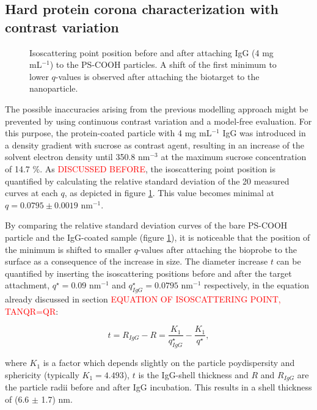 \subsection{Hard protein corona characterization with contrast variation}
\label{sec:coated_kisker_continuous}

\begin{figure}
	\centering
		
		\caption{Isoscattering point position before and after attaching IgG (4 mg mL$^{-1}$) to the PS-COOH particles. A shift of the first minimum to lower $q$-values is observed after attaching the biotarget to the nanoparticle.}
		\label{fig:CoatedKiskerIsopointComp}
\end{figure}

The possible inaccuracies arising from the previous modelling approach might be prevented by using continuous contrast variation and a model-free evaluation. For this purpose, the protein-coated particle with 4 mg mL$^{-1}$ IgG was introduced in a density gradient with sucrose as contrast agent, resulting in an increase of the solvent electron density until 350.8 nm$^{-3}$ at the maximum sucrose concentration of 14.7 $\%$. As \textcolor{red}{DISCUSSED BEFORE}, the isoscattering point position is quantified by calculating the relative standard deviation of the 20 measured curves at each $q$, as depicted in figure \ref{fig:CoatedKiskerIsopointComp}. This value becomes minimal at $q=0.0795\pm0.0019$ nm$^{-1}$.

By comparing the relative standard deviation curves of the bare PS-COOH particle \cite{garcia-diez_nanoparticle_2015} and the IgG-coated sample (figure \ref{fig:CoatedKiskerIsopointComp}), it is noticeable that the position of the minimum is shifted to smaller $q$-values after attaching the bioprobe to the surface as a consequence of the increase in size. The diameter increase $t$ can be quantified by inserting the isoscattering positions before and after the target attachment, $q^{\star}=0.09$ nm$^{-1}$ and $q^{\star}_{IgG}=0.0795$ nm$^{-1}$ respectively, in the equation already discussed in section  \textcolor{red}{EQUATION OF ISOSCATTERING POINT, TANQR=QR}:


\begin{equation}
t = R_{IgG} - R = \frac{K_1}{q^{\star}_{IgG}}-\frac{K_1}{q^{\star}} ,
\label{eq:IsopointRadiusDifference}
\end{equation}

where $K_1$ is a factor which depends slightly on the particle poydispersity and sphericity (typically $K_1 = 4.493$), $t$ is the IgG-shell thickness and $R$ and $R_{IgG}$ are the particle radii before and after IgG incubation. This results in a shell thickness of (6.6 $\pm$ 1.7) nm. 

